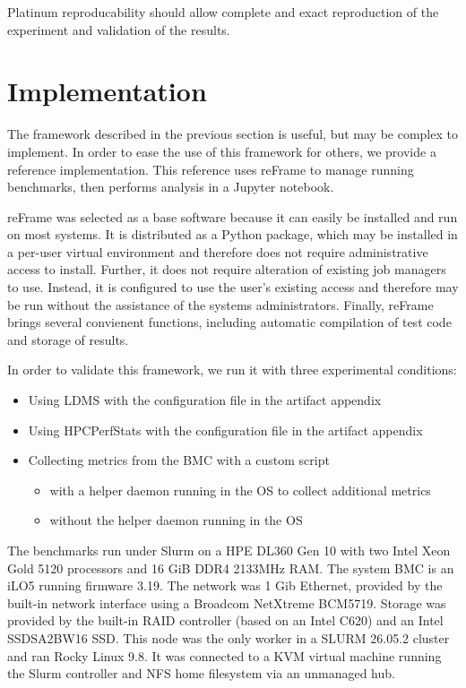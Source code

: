 \documentclass[conference]{IEEEtran}
\begin{document}
Platinum reproducability should allow complete and exact reproduction of the 
experiment and validation of the results.

\section{Implementation} \label{implementation}

The framework described in the previous section is useful, but may be complex 
to implement. In order to ease the use of this framework for others, we provide 
\cite{} a reference implementation. This reference uses 
reFrame\cite{karakasisRegressionFrameworkChecking} to manage running benchmarks,
then performs analysis in a Jupyter notebook.

reFrame was selected as a base software because it can easily be installed and 
run on most systems. It is 
distributed as a Python package, which may be installed in a per-user virtual environment 
and therefore does not require administrative access to install. Further, it 
does not require alteration of existing job managers to use. Instead, it is 
configured to use the user's existing access and therefore may be run without 
the assistance of the systems administrators. Finally, reFrame brings several 
convienent functions, including automatic compilation of test code and storage 
of results.

In order to validate this framework, we run it with three experimental 
conditions:

\begin{itemize}
    \item Using LDMS with the configuration file in the artifact appendix
    \item Using HPCPerfStats with the configuration file in the artifact appendix
    \item Collecting metrics from the BMC with a custom script
    \begin{itemize}
        \item with a helper daemon running in the OS to collect additional metrics
        \item without the helper daemon running in the OS
    \end{itemize}
\end{itemize}

The benchmarks run under Slurm on a HPE DL360 Gen 10 with two Intel Xeon Gold 
5120 processors and 16 GiB DDR4 2133MHz RAM. The system BMC is an iLO5 running firmware 3.19.
The network was 1 Gib Ethernet, provided by the built-in network interface using 
a Broadcom NetXtreme BCM5719. Storage was provided by the built-in RAID 
controller (based on an Intel C620) and an Intel SSDSA2BW16 SSD. This node was 
the only worker in a SLURM 26.05.2 cluster and ran Rocky Linux 9.8. It was 
connected to a KVM virtual machine running the Slurm controller and NFS home 
filesystem via an unmanaged hub.
\end{document}

